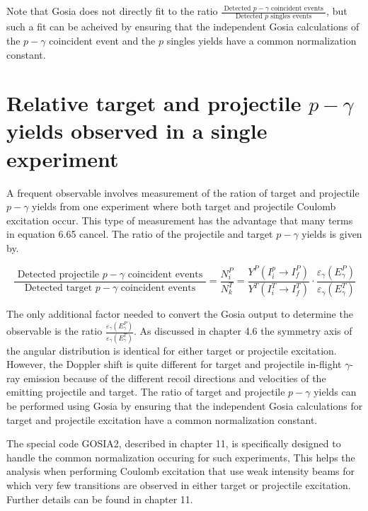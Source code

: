 \documentclass[10pt]{article}
\begin{document}
Note that Gosia does not directly fit to the ratio $\frac{\text { Detected } p-\gamma \text { coincident events }}{\text { Detected } p \text { singles events }}$, but such a fit can be acheived by ensuring that the independent Gosia calculations of the $p-\gamma$ coincident event and the $p$ singles yields have a common normalization constant.

\section*{Relative target and projectile $p-\gamma$ yields observed in a single experiment}
A frequent observable involves measurement of the ration of target and projectile $p-\gamma$ yields from one experiment where both target and projectile Coulomb excitation occur. This type of measurement has the advantage that many terms in equation 6.65 cancel. The ratio of the projectile and target $p-\gamma$ yields is given by.


\begin{equation*}
\frac{\text { Detected projectile } p-\gamma \text { coincident events }}{\text { Detected target } p-\gamma \text { coincident events }}=\frac{N_{i}^{P}}{N_{k}^{T}}=\frac{Y^{P}\left(I_{i}^{p} \rightarrow I_{f}^{P}\right)}{Y^{T}\left(I_{i}^{T} \rightarrow I_{f}^{T}\right)} \cdot \frac{\varepsilon_{\gamma}\left(E_{\gamma}^{P}\right)}{\varepsilon_{\gamma}\left(E_{\gamma}^{T}\right)} \tag{7.4}
\end{equation*}


The only additional factor needed to convert the Gosia output to determine the observable is the ratio $\frac{\varepsilon_{\gamma}\left(E_{\gamma}^{P}\right)}{\varepsilon_{\gamma}\left(E_{\gamma}^{T}\right)}$. As discussed in chapter 4.6 the symmetry axis of the angular distribution is identical for either target or projectile excitation. However, the Doppler shift is quite different for target and projectile in-flight $\gamma$-ray emission because of the different recoil directions and velocities of the emitting projectile and target. The ratio of target and projectile $p-\gamma$ yields can be performed using Gosia by ensuring that the independent Gosia calculations for target and projectile excitation have a common normalization constant.

The special code GOSIA2, described in chapter 11, is specifically designed to handle the common normalization occuring for such experiments, This helps the analysis when performing Coulomb excitation that use weak intensity beams for which very few transitions are observed in either target or projectile excitation. Further details can be found in chapter 11.
\end{document}
